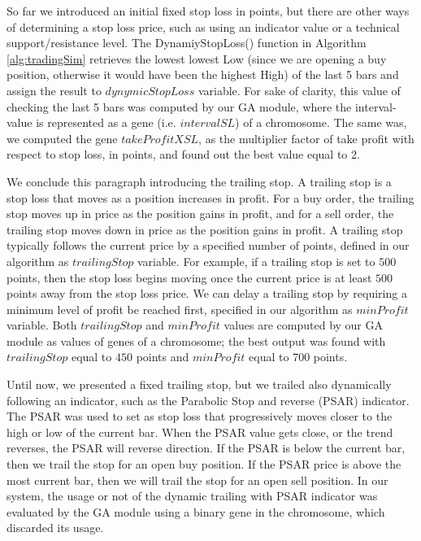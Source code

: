 So far we introduced an initial fixed stop loss in points, but there are other ways of determining a stop loss price, such as using an indicator value or a technical support/resistance level. The DynamiyStopLoss() function in Algorithm \ref{alg:tradingSim} retrieves the lowest lowest Low (since we are opening a buy position, otherwise it would have been the highest High) of the last 5 bars and assign the result to $dynymicStopLoss$ variable. For sake of clarity, this value of checking the last 5 bars was computed by our GA module, where the interval-value is represented as a gene (i.e. $intervalSL$) of a chromosome. The same was, we computed the gene $takeProfitXSL$, as the multiplier factor of take profit with respect to stop loss, in points, and found out the best value equal to 2.

We conclude this paragraph introducing the trailing stop. A trailing stop is a stop loss that moves as a position increases in profit. For a buy order, the trailing stop moves up in price as the position gains in profit, and for a sell order, the trailing stop moves down in price as the position gains in profit. A trailing stop typically follows the current price by a specified number of points, defined in our algorithm as $trailingStop$ variable. For example, if a trailing stop is set to $500$ points, then the stop loss begins moving once the current price is at least $500$ points away from the stop loss price. We can delay a trailing stop by requiring a minimum level of profit be reached first, specified in our algorithm as $minProfit$ variable. Both $trailingStop$ and $minProfit$ values are computed by our GA module as values of genes of a chromosome; the best output was found with $trailingStop$ equal to $450$ points and $minProfit$ equal to $700$ points. 

Until now, we presented a fixed trailing stop, but we trailed also dynamically following an indicator, such as the Parabolic Stop and reverse (PSAR) indicator. The PSAR was used to set as stop loss that progressively moves closer to the high or low of the current bar. When the PSAR value gets close, or the trend reverses, the PSAR will reverse direction. If the PSAR is below the current bar, then we trail the stop for an open buy position. If the PSAR price is above the most current bar, then we will trail the stop for an open sell position. In our system, the usage or not of the dynamic trailing with PSAR indicator was evaluated by the GA module using a binary gene in the chromosome, which discarded its usage.

